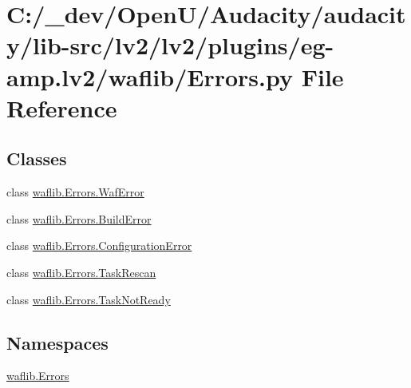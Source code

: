 \hypertarget{lv2_2plugins_2eg-amp_8lv2_2waflib_2_errors_8py}{}\section{C\+:/\+\_\+dev/\+Open\+U/\+Audacity/audacity/lib-\/src/lv2/lv2/plugins/eg-\/amp.lv2/waflib/\+Errors.py File Reference}
\label{lv2_2plugins_2eg-amp_8lv2_2waflib_2_errors_8py}
\subsection*{Classes}
\begin{DoxyCompactItemize}
\item 
class \hyperlink{classwaflib_1_1_errors_1_1_waf_error}{waflib.\+Errors.\+Waf\+Error}
\item 
class \hyperlink{classwaflib_1_1_errors_1_1_build_error}{waflib.\+Errors.\+Build\+Error}
\item 
class \hyperlink{classwaflib_1_1_errors_1_1_configuration_error}{waflib.\+Errors.\+Configuration\+Error}
\item 
class \hyperlink{classwaflib_1_1_errors_1_1_task_rescan}{waflib.\+Errors.\+Task\+Rescan}
\item 
class \hyperlink{classwaflib_1_1_errors_1_1_task_not_ready}{waflib.\+Errors.\+Task\+Not\+Ready}
\end{DoxyCompactItemize}
\subsection*{Namespaces}
\begin{DoxyCompactItemize}
\item 
 \hyperlink{namespacewaflib_1_1_errors}{waflib.\+Errors}
\end{DoxyCompactItemize}
